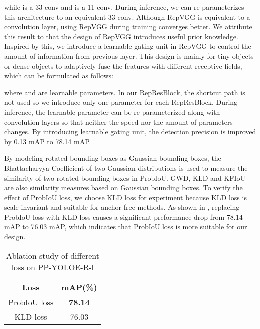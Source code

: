 \documentclass[final]{cvpr}
\begin{document}
while  is a 33 conv and  is a 11 conv. During inference, we can re-parameterizes this architecture to an equivalent 33 conv. Although RepVGG is equivalent to a convolution layer, using RepVGG during training converges better. We attribute this result to that the design of RepVGG introduces useful prior knowledge. Inspired by this, we introduce a learnable gating unit in RepVGG to control the amount of information from previous layer. This design is mainly for tiny objects or dense objects to adaptively fuse the features with different receptive fields, which can be formulated as follows:

where  and  are learnable parameters. In our RepResBlock\cite{xu2022pp}, the shortcut path is not used so we introduce only one parameter for each RepResBlock. During inference, the learnable parameter can be re-parameterized along with convolution layers so that neither the speed nor the amount of parameters changes. By introducing learnable gating unit, the detection precision is improved by 0.13 mAP to 78.14 mAP.

 By modeling rotated bounding boxes as Gaussian bounding boxes, the Bhattacharyya Coefficient of two Gaussian distributions is used to measure the similarity of two rotated bounding boxes in ProbIoU\cite{llerena2021gaussian}. GWD\cite{yang2021rethinking}, KLD\cite{yang2021learning} and KFIoU \cite{yang2022kfiou} are also similarity measures based on Gaussian bounding boxes. To verify the effect of ProbIoU loss, we choose KLD loss for experiment because KLD loss is scale invariant and suitable for anchor-free methods. As shown in , replacing ProbIoU loss with KLD loss causes a significant preformance drop from 78.14 mAP to 76.03 mAP, which indicates that ProbIoU loss is more suitable for our design.

\begin{table}[ht]
	\begin{center}
		\begin{tabular}{c|c}
			\hline
			Loss & mAP(\%) \\
			\hline
			
			ProbIoU loss\cite{llerena2021gaussian} & \textbf{78.14}  \\
			KLD loss\cite{yang2021learning} & 76.03 \\
			\hline
		\end{tabular}
	\end{center}
	
	\caption{Ablation study of different loss on PP-YOLOE-R-l}
	\label{loss_ablation}
\end{table}
\end{document}
